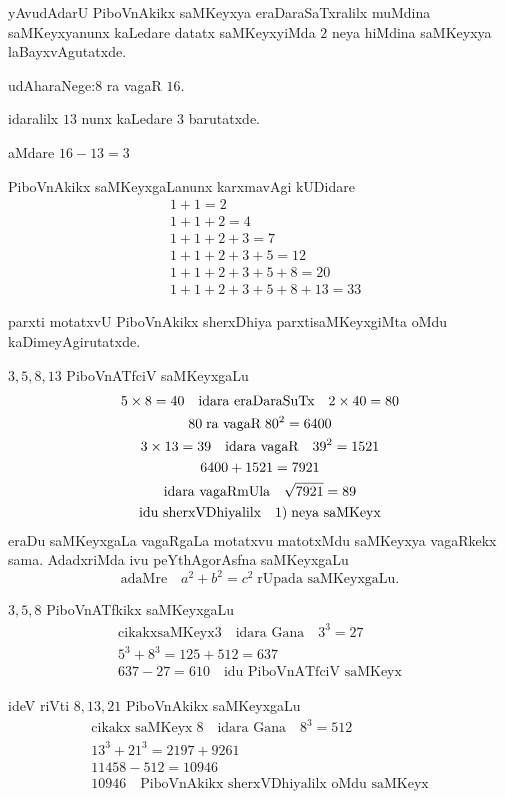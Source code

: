 yAvudAdarU PiboVnAkikx saMKeyxya eraDaraSaTxralilx muMdina saMKeyxyanunx kaLedare datatx saMKeyxyiMda $2$ neya hiMdina saMKeyxya laBayxvAgutatxde.

udAharaNege:\quad $8$ ra vagaR $16$.

idaralilx $13$ nunx  kaLedare $3$ barutatxde.

aMdare $16-13 =3$

PiboVnAkikx saMKeyxgaLanunx karxmavAgi kUDidare
\begin{align*}
&1+1=2\\
&1+1+2=4\\
&1+1+2+3=7\\
&1+1+2+3+5=12\\
&1+1+2+3+5+8=20\\
&1+1+2+3+5+8+13=33
\end{align*}

parxti motatxvU PiboVnAkikx sherxDhiya parxtisaMKeyxgiMta oMdu kaDimeyAgirutatxde.

$3,5,8,13$ PiboVnATfciV saMKeyxgaLu
\begin{gather*}
5\times 8 =40 \quad \text{idara eraDaraSuTx} \quad 2\times 40 = 80\\
80 \;\text{ra vagaR}\; 80^2 = 6400\\
3\times 13 =39 \quad \text{idara vagaR} \quad 39^2 = 1521\\
6400+1521 = 7921 \\
\text{idara vagaRmUla} \quad\sqrt{7921} =89\\
\text{idu sherxVDhiyalilx}\quad {\rm 1)}\;\text{neya saMKeyx} 
\end{gather*}
eraDu saMKeyxgaLa vagaRgaLa motatxvu matotxMdu saMKeyxya vagaRkekx sama. AdadxriMda ivu peYthAgorAsfna saMKeyxgaLu
$$
\text{adaMre}\quad a^2+b^2=c^2 \;\text{rUpada saMKeyxgaLu.}
$$

$3,5,8$ PiboVnATfkikx saMKeyxgaLu
\begin{gather*}
\text{cikakxsaMKeyx}3 \quad \text{idara Gana} \quad 3^3 = 27\\
5^{3}+8^{3} = 125+512 = 637\\
637-27 = 610 \quad\text{idu PiboVnATfciV saMKeyx}
\end{gather*}

ideV riVti $8,13,21$ PiboVnAkikx saMKeyxgaLu
\begin{gather*}
\text{cikakx saMKeyx}\;8 \quad \text{idara Gana} \quad 8^3=512\\
13^3+21^3 = 2197+9261\\
11458-512 = 10946\\
10946 \quad\text{PiboVnAkikx sherxVDhiyalilx oMdu saMKeyx} 
\end{gather*}

